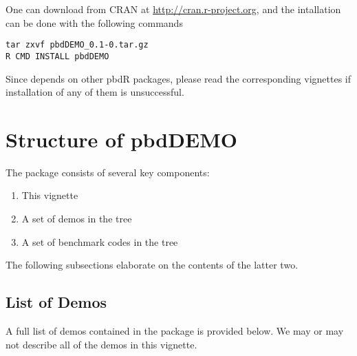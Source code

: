 One can download  from CRAN at
\url{http://cran.r-project.org}, and
the intallation can be done with the following commands
\begin{lstlisting}
tar zxvf pbdDEMO_0.1-0.tar.gz
R CMD INSTALL pbdDEMO
\end{lstlisting}
Since  depends on other pbdR packages, please read the corresponding vignettes if installation of any of them is unsuccessful.





\section{Structure of pbdDEMO}

The  package consists of several key components:

\begin{enumerate}
  \item This vignette
  \item A set of demos in the  tree
  \item A set of benchmark codes in the  tree
\end{enumerate}

The following subsections elaborate on the contents of the latter two.


\subsection{List of Demos}
\label{sec:demolist}

A full list of demos contained in the  package is provided below.  We may or may not describe all of the demos in this vignette.

